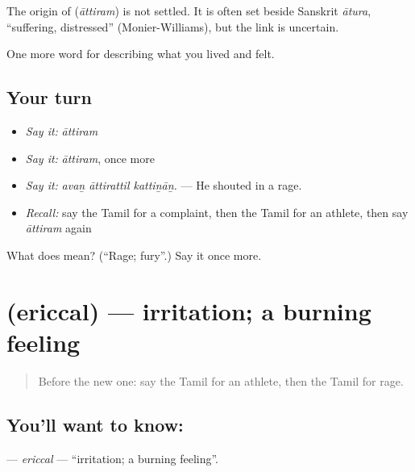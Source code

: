\begin{cousinweb}
The origin of \textbf{} (\emph{āttiram}) is not settled. It is often set beside Sanskrit \emph{ātura}, \textquotedblleft{}suffering, distressed\textquotedblright{} (Monier-Williams), but the link is uncertain.
\end{cousinweb}

\begin{grammarlens}[title={What you've built}]
One more word for describing what you lived and felt.
\end{grammarlens}

\subsection*{Your turn}
\begin{itemize}
\raggedright
  \item \emph{Say it:} \emph{āttiram}
  \item \emph{Say it:} \emph{āttiram}, once more
  \item \emph{Say it:} \emph{avaṉ āttirattil kattiṉāṉ.} — He shouted in a rage.
  \item \emph{Recall:} say the Tamil for a complaint, then the Tamil for an athlete, then say \emph{āttiram} again
\end{itemize}

\begin{tcolorbox}[breakable,colback=teal!4,colframe=teal!35!black,title={Before you move on}]
What does  mean? (\textquotedblleft{}Rage; fury\textquotedblright{}.) Say it once more.
\end{tcolorbox}
\section[\texorpdfstring{\ta{எரிச்சல்} (ericcal)}{எரிச்சல் (ericcal)}]{ (ericcal) — irritation; a burning feeling}

\label{lesson:TA-C453-ericcal}



\begin{quote}
Before the new one: say the Tamil for an athlete, then the Tamil for rage.
\end{quote}

\subsection*{You'll want to know: }
\textbf{} — \emph{ericcal} — \textquotedblleft{}irritation; a burning feeling\textquotedblright{}.

